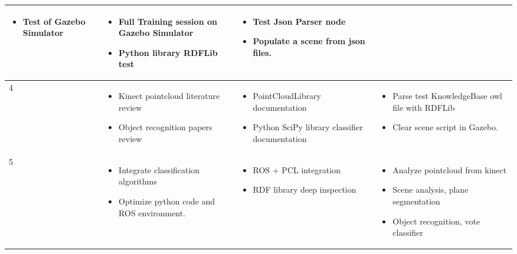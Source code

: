 \begin{center}
\begin{tabular}{ | l | p{4cm} | p{4cm} | p{5cm} |}
\begin{itemize}
     \item Test of Gazebo Simulator
     \end{itemize}  & 
     \begin{itemize}
     \item Full Training session on Gazebo Simulator \cite{bib10} 
     \item Python library RDFLib test 
     \end{itemize} & 
     \begin{itemize}
     \item Test Json Parser node
     \item Populate a scene from json files. 
     \end{itemize} \\ \hline
    4 & \begin{itemize}
     \item Kinect pointcloud literature review
     \item Object recognition papers review
     \end{itemize}  & 
     \begin{itemize}
     \item PointCloudLibrary documentation \cite{bib16}
     \item Python SciPy library classifier documentation
     \end{itemize}
      & \begin{itemize}
     \item Parse test KnowledgeBase owl file with RDFLib
     \item Clear scene script in Gazebo.
     \end{itemize}  \\
    \hline
    5 & \begin{itemize}
     \item Integrate classification algorithms
     \item Optimize python code and ROS environment.
     \end{itemize} 
     & \begin{itemize}
     \item ROS + PCL integration
     \item RDF library deep inspection
     \end{itemize} 
      & \begin{itemize}
     \item Analyze pointcloud from kinect
     \item Scene analysis, plane segmentation
     \item Object recognition, vote classifier

\end{itemize}
\end{tabular}
\end{center}
